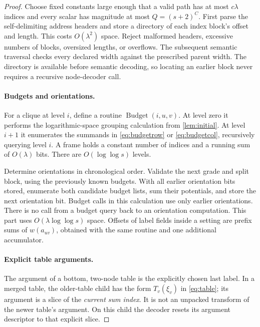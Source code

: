 \documentclass[11pt]{article}
\theoremstyle{definition}
\theoremstyle{remark}
\begin{document}
\begin{proof}
Choose fixed constants large enough that a valid path has at most $c\lambda$ indices and every scalar has magnitude at most $Q=(s+2)^C$. First parse the self-delimiting address headers and store a directory of each index block's offset and length. This costs $O(\lambda^2)$ space. Reject malformed headers, excessive numbers of blocks, oversized lengths, or overflows. The subsequent semantic traversal checks every declared width against the prescribed parent width. The directory is available before semantic decoding, so locating an earlier block never requires a recursive node-decoder call.

\paragraph{Budgets and orientations.}
For a clique at level $i$, define a routine $\operatorname{Budget}(i,u,v)$. At level zero it performs the logarithmic-space grouping calculation from \cref{lem:initial}. At level $i+1$ it enumerates the summands in \eqref{eq:budgetrow} or \eqref{eq:budgetcol}, recursively querying level $i$. A frame holds a constant number of indices and a running sum of $O(\lambda)$ bits. There are $O(\log\log s)$ levels.

Determine orientations in chronological order. Validate the next grade and split block, using the previously known budgets. With all earlier orientation bits stored, enumerate both candidate budget lists, sum their potentials, and store the next orientation bit. Budget calls in this calculation use only earlier orientations. There is no call from a budget query back to an orientation computation. This part uses $O(\lambda\log\log s)$ space. Offsets of label fields inside a setting are prefix sums of $w(a_{uv})$, obtained with the same routine and one additional accumulator.

\paragraph{Explicit table arguments.}
The argument of a bottom, two-node table is the explicitly chosen last label. In a merged table, the older-table child has the form $T_v(\xi_v)$ in \eqref{eq:table}; its argument is a slice of the \emph{current sum index}. It is not an unpacked transform of the newer table's argument. On this child the decoder resets its argument descriptor to that explicit slice.


\end{proof}
\end{document}
